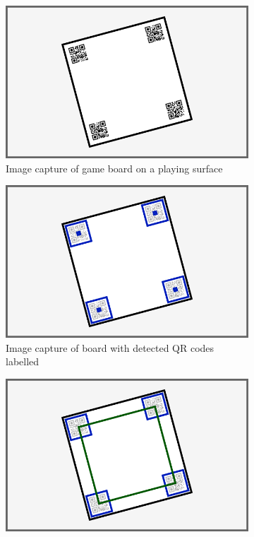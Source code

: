 \documentclass[12pt]{article}
\begin{document}
\begin{figure}[H]
    \centering
    \begin{subfigure}{0.65\textwidth}
        \includegraphics[width=1\textwidth]{images/figures/fig4a}
        \caption{Image capture of game board on a playing surface}
        \label{fig:boarddetectiona}
    \end{subfigure}
    \begin{subfigure}{0.65\textwidth}
        \includegraphics[width=1\textwidth]{images/figures/fig4b}
        \caption{Image capture of board with detected QR codes labelled}
        \label{fig:boarddetectionb}
    \end{subfigure}
    \begin{subfigure}{0.65\textwidth}
        \includegraphics[width=1\textwidth]{images/figures/fig4c}

\end{subfigure}
\end{figure}
\end{document}
